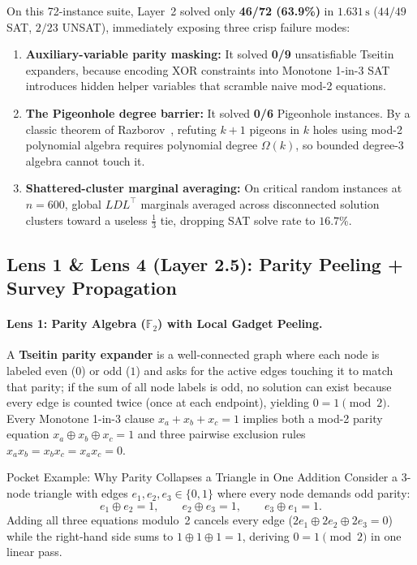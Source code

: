 \documentclass[11pt]{article}
\begin{document}
On this 72-instance suite, Layer~2 solved only \textbf{46/72 (63.9\%)} in $1.631\,\text{s}$ ($44/49$ SAT, $2/23$ UNSAT), immediately exposing three crisp failure modes:
\begin{enumerate}
  \item \textbf{Auxiliary-variable parity masking:} It solved \textbf{0/9} unsatisfiable Tseitin expanders, because encoding XOR constraints into Monotone 1-in-3 SAT introduces hidden helper variables that scramble naive mod-2 equations.
  \item \textbf{The Pigeonhole degree barrier:} It solved \textbf{0/6} Pigeonhole instances. By a classic theorem of Razborov~\cite{razborov1998}, refuting $k+1$ pigeons in $k$ holes using mod-2 polynomial algebra requires polynomial degree $\Omega(k)$, so bounded degree-3 algebra cannot touch it.
  \item \textbf{Shattered-cluster marginal averaging:} On critical random instances at $n = 600$, global $LDL^\top$ marginals averaged across disconnected solution clusters toward a useless $\frac{1}{3}$ tie, dropping SAT solve rate to $16.7\%$.
\end{enumerate}

\subsection{Lens 1 \& Lens 4 (Layer 2.5): Parity Peeling + Survey Propagation}

\paragraph{Lens 1: Parity Algebra ($\mathbb{F}_2$) with Local Gadget Peeling.}
A \textbf{Tseitin parity expander} is a well-connected graph where each node is labeled even ($0$) or odd ($1$) and asks for the active edges touching it to match that parity; if the sum of all node labels is odd, no solution can exist because every edge is counted twice (once at each endpoint), yielding $0 = 1 \pmod{2}$. Every Monotone 1-in-3 clause $x_a + x_b + x_c = 1$ implies both a mod-2 parity equation $x_a \oplus x_b \oplus x_c = 1$ and three pairwise exclusion rules $x_a x_b = x_b x_c = x_a x_c = 0$.

\begin{intuition}{Pocket Example: Why Parity Collapses a Triangle in One Addition}
Consider a 3-node triangle with edges $e_1, e_2, e_3 \in \{0, 1\}$ where every node demands odd parity:
\[
e_1 \oplus e_2 = 1, \qquad e_2 \oplus e_3 = 1, \qquad e_3 \oplus e_1 = 1.
\]
Adding all three equations modulo~2 cancels every edge ($2e_1 \oplus 2e_2 \oplus 2e_3 = 0$) while the right-hand side sums to $1 \oplus 1 \oplus 1 = 1$, deriving $0 = 1 \pmod{2}$ in one linear pass.
\end{intuition}
\end{document}
